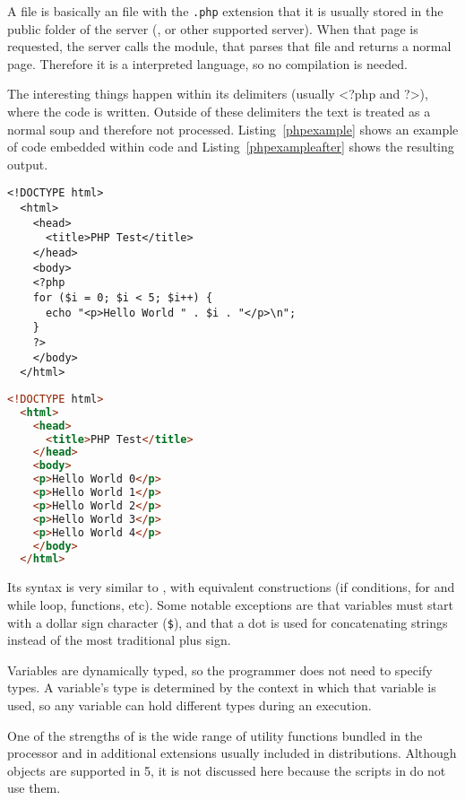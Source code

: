 A  file is basically an  file with the \texttt{.php} extension that it is usually stored in the public folder of the server (,  or other supported server).
When that page is requested, the server calls the  module, that parses that file and returns a normal  page.
Therefore it is a interpreted language, so no compilation is needed.

The interesting things happen within its delimiters
(usually <?php and ?>), where the  code is written.
Outside of these delimiters the text is treated as a normal  soup and therefore not processed.
Listing~\vref{phpexample} shows an example of  code embedded within  code and Listing~\vref{phpexampleafter} shows the resulting  output.

\begin{lstlisting}[float=htbp,label=phpexample,language={[phpoo]php},alsolanguage=html,caption=\idx{PHP} code embedded within \idx{HTML} code] % java
  <!DOCTYPE html>
  <html>
    <head>
      <title>PHP Test</title>
    </head>
    <body>
    <?php
    for ($i = 0; $i < 5; $i++) {
      echo "<p>Hello World " . $i . "</p>\n";
    }
    ?>
    </body>
  </html>
\end{lstlisting}

\begin{lstlisting}[float=htbp,label=phpexampleafter,language=html,caption=Resulting \idx{HTML} code]
  <!DOCTYPE html>
  <html>
    <head>
      <title>PHP Test</title>
    </head>
    <body>
    <p>Hello World 0</p>
    <p>Hello World 1</p>
    <p>Hello World 2</p>
    <p>Hello World 3</p>
    <p>Hello World 4</p>
    </body>
  </html>
\end{lstlisting}

Its syntax is very similar to , with equivalent constructions (if conditions, for and while loop, functions, etc).
Some notable exceptions are that variables must start with a dollar sign character (\texttt{\$}), and that a dot is used for concatenating strings instead of the most traditional plus sign.

Variables are dynamically typed, so the programmer does not need to specify types. A variable's type is determined by the context in which that variable is used, so any variable can hold different types during an execution.

One of the strengths of  is the wide range of utility functions bundled in the processor and in additional extensions usually included in distributions.
Although objects are supported in  5, it is not discussed here because the scripts in  do not use them.

